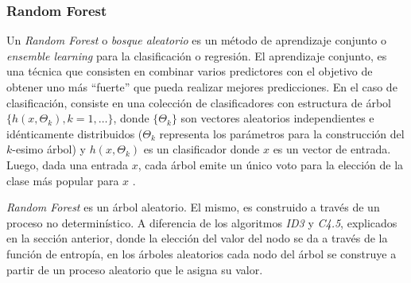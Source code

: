 \subsubsection{Random Forest}
\label{subsubsection:random_forest}

	

	Un \textit{Random Forest} o \textit{bosque aleatorio} es un método de aprendizaje conjunto o \textit{ ensemble learning} para la clasificación o regresión. El aprendizaje conjunto, es una técnica que consisten en combinar varios predictores con el objetivo de obtener uno más ``fuerte'' que pueda realizar mejores predicciones. En el caso de clasificación, consiste en una colección de clasificadores con estructura de árbol $\{h(x,\Theta_k), k = 1,\dots\}$, donde $\{\Theta_k\}$ son vectores aleatorios independientes e idénticamente distribuidos ($\Theta_k$ representa los parámetros para la construcción del $k$-esimo árbol) y $h(x,\Theta_k)$ es un clasificador donde $x$ es un vector de entrada. Luego, dada una entrada $x$, cada árbol emite un único voto para la elección de la clase más popular para $x$ \cite{Breiman01}.

	\textit{Random Forest} es un árbol aleatorio. El mismo, es construido a través de un proceso no determinístico. A diferencia de los algoritmos \textit{ID3} y \textit{C4.5}, explicados en la sección anterior, donde la elección del valor del nodo se da a través de la función de entropía, en los árboles aleatorios cada nodo del árbol se construye a partir de un proceso aleatorio que le asigna su valor.

